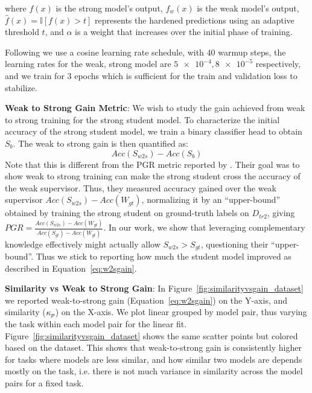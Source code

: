 where \(f(x)\) is the strong model's output, \(f_w(x)\) is the weak model's output, \(\hat{f}(x) = \mathbb{I}[f(x) > t]\) represents the hardened predictions using an adaptive threshold \(t\), and \(\alpha\) is a weight that increases over the initial phase of training.

Following \citet{scherlis2024w2seleuther} we use a cosine learning rate schedule, with $40$ warmup steps, the learning rates for the weak, strong model are $\num{5e-4}, \num{8e-5}$ respectively, and we train for $3$ epochs which is sufficient for the train and validation loss to stabilize.

\textbf{Weak to Strong Gain Metric}: We wish to study the gain achieved from weak to strong training for the strong student model. To characterize the initial accuracy of the strong student model, we train a binary classifier head to obtain $S_b$. The weak to strong gain is then quantified as:
\begin{equation}
    \label{eq:w2sgain}
    Acc(S_{w2s}) - Acc(S_b)
\end{equation} 
Note that this is different from the PGR metric reported by \citet{burns2024weaktostrong}. Their goal was to show weak to strong training can make the strong student cross the accuracy of the weak supervisor. Thus, they measured accuracy gained over the weak supervisor $Acc(S_{w2s}) - Acc(W_{gt})$, normalizing it by an ``upper-bound'' obtained by training the strong student on ground-truth labels on $D_{tr2}$, giving $PGR = 
\frac{Acc(S_{w2s}) - Acc(W_{gt})}{Acc(S_{gt})- Acc(W_{gt})}$. In our work, we show that leveraging complementary knowledge effectively might actually allow $S_{w2s} > S_{gt}$, questioning their ``upper-bound''. Thus we stick to reporting how much the student model improved as described in Equation~\ref{eq:w2sgain}.

\textbf{Similarity vs Weak to Strong Gain}: In Figure~\ref{fig:similarityvsgain_dataset} we reported weak-to-strong gain (Equation~\ref{eq:w2sgain}) on the Y-axis, and similarity ($\kappa_{p}$) on the X-axis. We plot linear grouped by model pair, thus varying the task within each model pair for the linear fit. Figure~\ref{fig:similarityvsgain_dataset} shows the same scatter points but colored based on the dataset. This shows that weak-to-strong gain is consistently higher for tasks where models are less similar, and how similar two models are depends mostly on the task, i.e. there is not much variance in similarity across the model pairs for a fixed task. 

